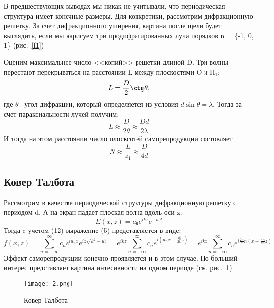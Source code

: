 \documentclass{urticle}
\begin{document}
    В предшествующих выводах мы никак не учитывали, что периодическая структура имеет конечные размеры. Для конкретики, рассмотрим дифракционную решетку. За счет дифракционного уширения, картина после щели будет выглядить, если мы нарисуем три продифрагированных луча порядков n = \{-1, 0, 1\} (рис.~\ref{f1})

    Оценим максимальное число <<копий>> решетки длиной D. Три волны перестают перекрываться на расстоянии L между плоскостями O и П$_1$:
    \begin{equation}
        L = \frac{D}{2}\ctg\theta,
    \end{equation}
    где $\theta$-- угол дифракции, который определяется из условия $d\sin\theta = \lambda$. Тогда за счет параксиальности лучей получим:
    \begin{equation}
        L \approx \frac{D}{2\theta} \approx \frac{Dd}{2\lambda}
    \end{equation}
    И тогда на этом расстоянии число плосксотей саморепродукции состовляет
    \begin{equation}
        N \approx \frac{L}{z_1} \approx \frac{D}{4d}
    \end{equation}
\newpage
\subsection{Ковер Талбота}
    Рассмотрим в качестве периодической структуры дифракционную решетку с периодом d. А на экран падает плоская волна вдоль оси z:
    \begin{equation}
        E(x,z) = a_0 e^{ikz} e^{-i\omega t}
    \end{equation}        
    Тогда c учетом (12) выражение (5) представляется в виде:
    \begin{equation}
        f(x,z) = \sum_{n=-\infty}^{\infty} c_{n} e^{i u_n x}e^{iz\sqrt{k^2-u_n^2}} = e^{ikz} \sum_{n=-\infty}^{\infty} c_{n} e^{i( u_n x -\frac{u_n^2}{2k}z)} = e^{ikz} \sum_{n=-\infty}^{\infty} c_{n} e^{i \frac{2\pi}{d}n(x -\frac{\pi n}{kd}z)}
    \end{equation}
    Эффект саморепродукции конечно проявляется и в этом случае. Но больший интерес представляет картина интесивности на одном периоде (см. рис.~\ref{f2})
    \begin{figure}[h]
        \begin{center}
            \texttt{[image: 2.png]}
        \end{center}
        \caption{Ковер Талбота}
        \label{f2}
    \end{figure}
    
\end{document}

